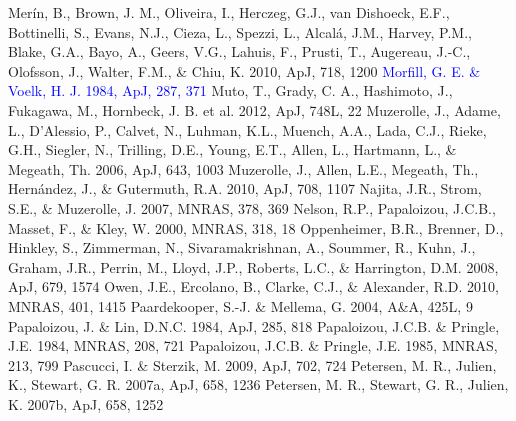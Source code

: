 \documentclass[apj]{emulateapj}
\def\blue#1{\textcolor{blue}{#1}}
\begin{document}
\begin{thebibliography}{}
 Mer\'in, B., Brown, J. M., Oliveira, I., Herczeg, G.J., van Dishoeck, E.F., Bottinelli, S., Evans, N.J., Cieza, L., Spezzi, L., Alcal\'a, J.M., Harvey, P.M., Blake, G.A., Bayo, A., Geers, V.G., Lahuis, F., Prusti, T., Augereau, J.-C., Olofsson, J., Walter, F.M., \& Chiu, K. 2010, ApJ, 718, 1200
\bibitem[{{\blue{Morfill \& V\"olk}}(1984)}]{Morfill-Volk84}\blue{Morfill, G. E. \& Voelk, H. J. 1984, ApJ, 287, 371}
 Muto, T., Grady, C. A., Hashimoto, J., Fukagawa, M., Hornbeck, J. B. et al. 2012, ApJ, 748L, 22
 Muzerolle, J., Adame, L., D'Alessio, P., Calvet, N., Luhman, K.L., Muench, A.A., Lada, C.J., Rieke, G.H., Siegler, N., Trilling, D.E., Young, E.T., Allen, L., Hartmann, L., \& Megeath, Th. 2006, ApJ, 643, 1003
 Muzerolle, J., Allen, L.E., Megeath, Th., Hern\'andez, J., \& Gutermuth, R.A. 2010, ApJ, 708, 1107
 Najita, J.R., Strom, S.E., \& Muzerolle, J. 2007, MNRAS, 378, 369
 Nelson, R.P., Papaloizou, J.C.B., Masset, F., \& Kley, W. 2000, MNRAS, 318, 18
 Oppenheimer, B.R., Brenner, D., Hinkley, S., Zimmerman, N., Sivaramakrishnan, A., Soummer, R., Kuhn, J., Graham, J.R., Perrin, M., Lloyd, J.P., Roberts, L.C., \& Harrington, D.M. 2008, ApJ, 679, 1574
 Owen, J.E., Ercolano, B., Clarke, C.J., \& Alexander, R.D. 2010, MNRAS, 401, 1415
 Paardekooper, S.-J. \& Mellema, G.	2004, A\&A, 425L, 9
 Papaloizou, J. \& Lin, D.N.C. 1984, ApJ, 285, 818
 Papaloizou, J.C.B. \& Pringle, J.E. 1984, MNRAS, 208, 721
 Papaloizou, J.C.B. \& Pringle, J.E. 1985, MNRAS, 213, 799
 Pascucci, I. \& Sterzik, M. 2009, ApJ, 702, 724
 Petersen, M. R., Julien, K., Stewart, G. R. 2007a, ApJ, 658, 1236
 Petersen, M. R., Stewart, G. R., Julien, K. 2007b, ApJ, 658, 1252

\end{thebibliography}
\end{document}
